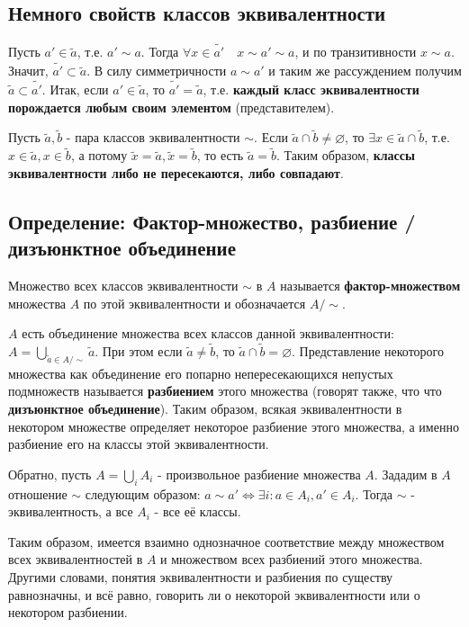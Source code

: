 \documentclass{article}
\begin{document}
\subsection{Немного свойств классов эквивалентности}

Пусть $a' \in \tilde{a}$, т.е. $a' \sim a$. Тогда $\forall x \in \tilde{a'} \quad x \sim a' \sim a$, и по транзитивности $x \sim a$. Значит, $\tilde{a'} \subset \tilde{a}$. В силу симметричности $a \sim a'$ и таким же рассуждением получим $\tilde{a} \subset \tilde{a'}$. Итак, если $a' \in \tilde{a}$, то $\tilde{a'} = \tilde{a}$, т.е. \textbf{каждый класс эквивалентности порождается любым своим элементом} (представителем).

Пусть $\tilde{a}, \tilde{b}$ - пара классов эквивалентности $\sim$. Если $\tilde{a} \cap \tilde{b} \neq \varnothing$, то $\exists x \in \tilde{a} \cap \tilde{b}$, т.е. $x \in \tilde{a}, x \in \tilde{b}$, а потому $\tilde{x} = \tilde{a}, \tilde{x} = \tilde{b}$, то есть $\tilde{a} = \tilde{b}$. Таким образом, \textbf{классы эквивалентности либо не пересекаются, либо совпадают}.

\subsection{Определение: Фактор-множество, разбиение / дизъюнктное объединение}

Множество всех классов эквивалентности $\sim$ в $A$ называется \textbf{фактор-множеством} множества $A$ по этой эквивалентности и обозначается $A/\sim$.

$A$ есть объединение множества всех классов данной эквивалентности: $A = \underset{\tilde{a} \in A/\sim}{\bigcup} \tilde{a}$. При этом если $\tilde{a} \neq \tilde{b}$, то $\tilde{a} \cap \tilde{b} = \varnothing$. Представление некоторого множества как объединение его попарно непересекающихся непустых подмножеств называется \textbf{разбиением} этого множества (говорят также, что что \textbf{дизъюнктное объединение}). Таким образом, всякая эквивалентности в некотором множестве определяет некоторое разбиение этого множества, а именно разбиение его на классы этой эквивалентности.

Обратно, пусть $A = \underset{i}{\bigcup}A_i$ - произвольное разбиение множества $A$. Зададим в $A$ отношение $\sim$ следующим образом: $a \sim a' \Leftrightarrow \exists i : a \in A_i, a' \in A_i$. Тогда $\sim$ - эквивалентность, а все $A_i$ - все её классы.

Таким образом, имеется взаимно однозначное соответствие между множеством всех эквивалентностей в $A$ и множеством всех разбиений этого множества. Другими словами, понятия эквивалентности и разбиения по существу равнозначны, и всё равно, говорить ли о некоторой эквивалентности или о некотором разбиении.
\end{document}
